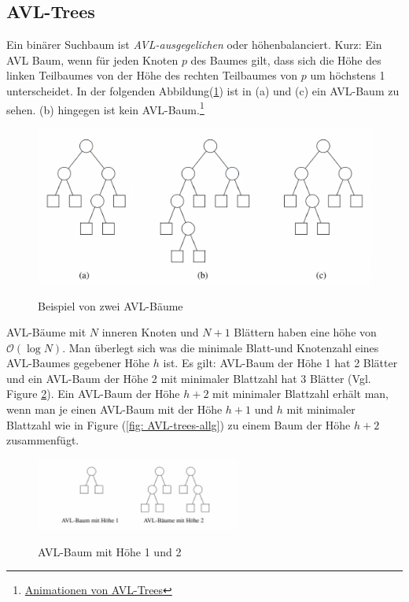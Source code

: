\documentclass[a4paper]{article}
\begin{document}
\subsection{AVL-Trees} \label{AVL-Abschnitt}
Ein binärer Suchbaum ist \textit{AVL-ausgegelichen} oder höhenbalanciert. Kurz: Ein AVL Baum, wenn für jeden Knoten $p$ des Baumes gilt, dass sich die Höhe des linken Teilbaumes von der Höhe des rechten Teilbaumes von $p$ um höchstens 1 unterscheidet. In der folgenden Abbildung(\ref{fig: AVL-trees}) ist in (a)  und (c) ein AVL-Baum zu sehen. (b) hingegen ist kein AVL-Baum.\footnote{\href{https://www.cs.usfca.edu/~galles/visualization/AVLtree.html}{Animationen von AVL-Trees}}

\begin{figure}[h] 
\caption{Beispiel von zwei AVL-Bäume}
\centering
\includegraphics[scale= 0.5]{Pictures/AVL-trees.png}
\label{fig: AVL-trees}
\end{figure}

AVL-Bäume mit $N$ inneren Knoten und $N+1$ Blättern haben eine höhe von $\mathcal{O}(\log N)$. Man überlegt sich was die minimale Blatt-und Knotenzahl eines AVL-Baumes gegebener Höhe $h$ ist. Es gilt: AVL-Baum der Höhe 1 hat 2 Blätter und ein AVL-Baum der Höhe 2 mit minimaler Blattzahl hat 3 Blätter (Vgl. Figure \ref{fig: AVL-trees-height}). Ein AVL-Baum der Höhe $h+2$ mit minimaler Blattzahl erhält man, wenn man je einen AVL-Baum mit der Höhe $h+1$ und $h$ mit minimaler Blattzahl wie in Figure (\ref{fig: AVL-trees-allg}) zu einem Baum der Höhe $h+2$ zusammenfügt.

\begin{figure}[h] 
\caption{AVL-Baum mit Höhe 1 und 2}
\centering
\includegraphics[width = 0.6\textwidth]{Pictures/AVL-trees-height.png}
\label{fig: AVL-trees-height}
\end{figure}
\end{document}
